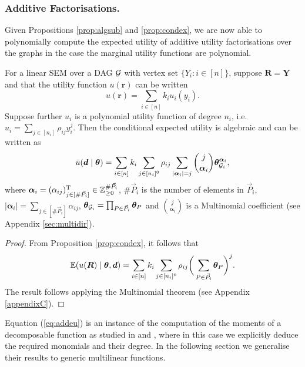 \subsubsection{Additive Factorisations.}
Given Propositions \ref{prop:algsub} and \ref{prop:condex}, we are now able to polynomially compute the expected utility of additive utility factorisations over the graphs in the case the marginal utility functions are polynomial.

\begin{lemma}
\label{lemma:addeu}
For a linear SEM over a DAG $\mathcal{G}$ with vertex set $\{Y_i:i\in[n]\}$, suppose $\bm{R}=\bm{Y}$ and that the utility function $u(\bm{r})$ can be written
\begin{equation*}
u(\bm{r})=\sum_{i\in[n]}k_iu_i(y_i).
\end{equation*}
Suppose further $u_i$ is a polynomial utility function of degree $n_i$, i.e. $u_i=\sum_{j\in[n_i]}\rho_{ij}y_i^j$. Then the conditional expected utility is algebraic and can be written as
\begin{equation}
\label{eq:addeu}
\bar{u}(\bm{d}\;|\;\bm{\theta})=\sum_{i\in[n]}k_i\sum_{j\in[n_i]^0}\rho_{ij}\sum_{|\bm{\alpha}_i|=j}\binom{j}{\bm{\alpha}_i}\bm{\theta}_{\Gr_i}^{\bm{\alpha}_i},
\end{equation}
where $\bm{\alpha}_i=(\alpha_{ij})^{\textnormal{T}}_{j\in[\#\vec{P}_i]}\in\mathbb{Z}_{\geq 0}^{\#\vec{P}_i}$, $\#\vec{P}_i$ is the number of elements in $\vec{P}_i$, $|\bm{\alpha}_i|=\sum_{j\in[\#\vec{P}_i]}\alpha_{ij}$, $\bm{\theta}_{\mathcal{G}_i}=\prod_{P\in\vec{P}_i}\bm{\theta}_P$ and $\binom{j}{\bm{\alpha}_i}$ is a Multinomial coefficient (see Appendix \ref{sec:multidir}).
\end{lemma}

\begin{proof}
From Proposition \ref{prop:condex}, it follows that
\begin{equation*}
\label{eq:additiveEU}
\E(u(\bm{R})\;|\;\bm{\theta},\bm{d})=\sum_{i\in[n]}k_i\sum_{j\in[n_i]^0}\rho_{ij}\bigg(\sum_{P\in\vec{P}_i}\bm{\theta}_P\bigg)^j.
\end{equation*}
The result follows applying the Multinomial theorem (see Appendix \ref{appendixC}).
\end{proof}

Equation (\ref{eq:addeu}) is an instance of the computation of the moments of a decomposable function as studied in \citet{Cowell1999a} and \citet{Nilsson2001}, where in this case we explicitly deduce the required monomials and their degree. In the following section we generalise their results to generic multilinear functions. 

